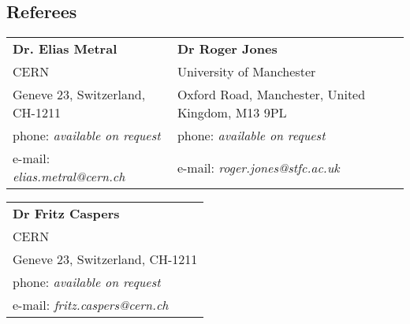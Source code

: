 \documentclass[margin,line]{resume}
\begin{document}
\begin{resume}
\section{\mysidestyle Referees} 

\begin{tabular}{@{}p{6cm}p{6cm}}
\textbf{Dr. Elias Metral}       &  \textbf{Dr Roger Jones}                   \\
CERN                     &  University of Manchester                      \\
Geneve 23, Switzerland, CH-1211           &  Oxford Road, Manchester, United Kingdom, M13 9PL        \\
phone: \textsl{available on request}    &  phone: \textsl{available on request}     \\
e-mail: \textsl{elias.metral@cern.ch}   &  e-mail: \textsl{roger.jones@stfc.ac.uk}    \\
\end{tabular}

\begin{tabular}{@{}p{6cm}}
\textbf{Dr Fritz Caspers}           \\
CERN                    		         \\
Geneve 23, Switzerland, CH-1211 \\      
phone: \textsl{available on request} \\  
e-mail: \textsl{fritz.caspers@cern.ch} \\
\end{tabular}



\end{resume}
\end{document}
